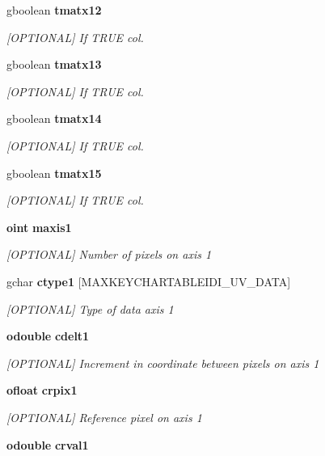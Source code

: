 \begin{CompactItemize}
gboolean {\bf tmatx12}
\begin{CompactList}\small\item\em [OPTIONAL] If TRUE col. \item\end{CompactList}\item 
gboolean {\bf tmatx13}
\begin{CompactList}\small\item\em [OPTIONAL] If TRUE col. \item\end{CompactList}\item 
gboolean {\bf tmatx14}
\begin{CompactList}\small\item\em [OPTIONAL] If TRUE col. \item\end{CompactList}\item 
gboolean {\bf tmatx15}
\begin{CompactList}\small\item\em [OPTIONAL] If TRUE col. \item\end{CompactList}\item 
{\bf oint} {\bf maxis1}
\begin{CompactList}\small\item\em [OPTIONAL] Number of pixels on axis 1 \item\end{CompactList}\item 
gchar {\bf ctype1} [MAXKEYCHARTABLEIDI\_\-UV\_\-DATA]
\begin{CompactList}\small\item\em [OPTIONAL] Type of data axis 1 \item\end{CompactList}\item 
{\bf odouble} {\bf cdelt1}
\begin{CompactList}\small\item\em [OPTIONAL] Increment in coordinate between pixels on axis 1 \item\end{CompactList}\item 
{\bf ofloat} {\bf crpix1}
\begin{CompactList}\small\item\em [OPTIONAL] Reference pixel on axis 1 \item\end{CompactList}\item 
{\bf odouble} {\bf crval1}

\end{CompactItemize}
